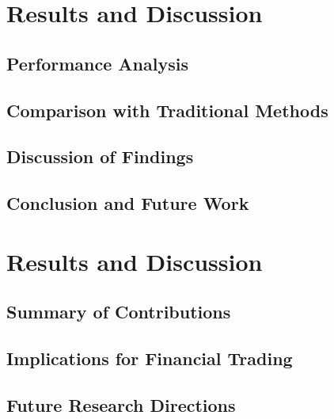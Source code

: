 \documentclass[preprint,review,12pt]{elsarticle}
\begin{document}
\section{Results and Discussion}
\subsection{Performance Analysis}
\subsection{Comparison with Traditional Methods}
\subsection{Discussion of Findings}
\subsection{Conclusion and Future Work}
\section{Results and Discussion}
\subsection{Summary of Contributions}
\subsection{Implications for Financial Trading}
\subsection{Future Research Directions}



\end{document}
